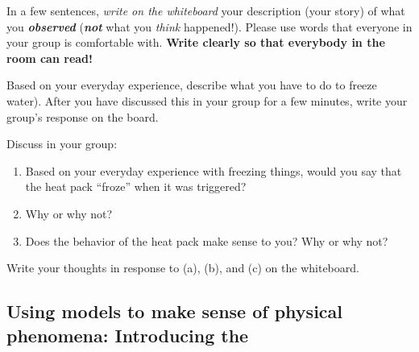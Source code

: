 \begin{benumerate}
	In a few sentences, \emph{write on the whiteboard} your description (your story) of what you \textbf{\emph{observed}} (\textbf{\emph{not}} what you \emph{think} happened!). Please use words that everyone in your group is comfortable with. \textbf{Write clearly so that everybody in the room can read!}
	
	
	Based on your everyday experience, describe what you have to do to freeze water). After you have discussed this in your group for a few minutes, write your group's response on the board.
	
	
	
	Discuss in your group:
	\begin{enumerate}
		\item Based on your everyday experience with freezing things, would you say that the heat pack ``froze'' when it was triggered?
		\item Why or why not?
		\item Does the behavior of the heat pack make sense to you? Why or why not?
	\end{enumerate}
	Write your thoughts in response to (a), (b), and (c) on the whiteboard.

\WCD

\end{benumerate}


\subsection[Using models to make sense of physical phenomena]{Using models to make sense of physical phenomena: Introducing the \ThreePhaseModel{}}

